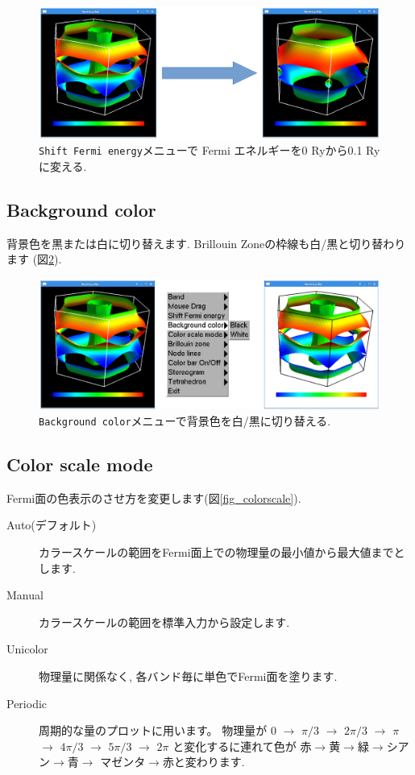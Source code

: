 \documentclass[12pt]{jarticle}
\begin{document}
\begin{figure}[!ht]
  \includegraphics[width=17cm]{figs/shift.eps}
  \caption{\texttt{Shift Fermi energy}メニューで
    Fermi エネルギーを0 Ryから0.1 Ryに変える.}
  \label{fig_shift}
\end{figure}

\subsection{Background color}

背景色を黒または白に切り替えます. 
Brillouin Zoneの枠線も白/黒と切り替わります (図\ref{fig_background}). 

\begin{figure}[!ht]
  \includegraphics[width=17cm]{figs/background.eps}
  \caption{\texttt{Background color}メニューで背景色を白/黒に切り替える.}
  \label{fig_background}
\end{figure}

\subsection{Color scale mode}

Fermi面の色表示のさせ方を変更します(図\ref{fig_colorscale}). 
\begin{description}
\item[Auto(デフォルト)] 
  カラースケールの範囲をFermi面上での物理量の最小値から最大値までとします.
\item[Manual] カラースケールの範囲を標準入力から設定します.
\item[Unicolor] 物理量に関係なく, 各バンド毎に単色でFermi面を塗ります.
\item[Periodic] 周期的な量のプロットに用います。
  物理量が
  0 $\rightarrow$ $\pi/3$ $\rightarrow$ $2\pi/3$ $\rightarrow$ $\pi$ $\rightarrow$ 
  $4\pi/3$ $\rightarrow$ $5\pi/3$ $\rightarrow$ $2\pi$
  と変化するに連れて色が
  赤$\rightarrow$黄$\rightarrow$緑$\rightarrow$シアン$\rightarrow$青$\rightarrow$
  マゼンタ$\rightarrow$赤と変わります. 
\end{description}
\end{document}
